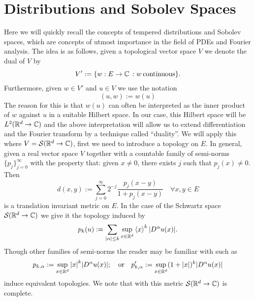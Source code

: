 \documentclass[
    a4paper,
    DIV=14,
    abstract=true,
    numbers=noenddot
]{scrartcl}
\begin{document}
\section{Distributions and Sobolev Spaces}\label{distrsec}
Here we will quickly recall the concepts of tempered distributions and Sobolev spaces, which are concepts of utmost importance in the field of PDEs and Fourier analysis.
The idea is as follows, given a topological vector space $V$ we denote the dual of $V$  by \[V':=\lbrace w:E\to\mathbb{C}\hspace{2pt}: w \hspace{2pt}\text{continuous}\rbrace.\]
Furthermore, given $w\in V'$ and $u\in V$ we use the notation
\begin{equation*}
	(u,w):=w(u)
\end{equation*}
The reason for this is that $w(u)$ can often be interpreted as the inner product of $w$ against $u$ in a suitable Hilbert space. In our case, this Hilbert space will be $L^2(\mathbb{R}^d\to\mathbb{C})$ and the above interpretation will allow us to extend differentiation and the Fourier transform by a technique called ``duality''.
\bigbreak  We will apply this where $V=\mathcal{S}(\mathbb{R}^d\to\mathbb{C})$, first we need to introduce a topology on $E$.
In general, given a real vector space $V$ together with a countable family of semi-norms $\lbrace p_j\rbrace_{j=0}^\infty$ with the property that: given $x\neq 0$, there exists $j$ such that $p_j(x)\neq 0$. Then
\begin{equation}\label{seminormsgivemetric}
	d(x,y):=\sum_{j=0}^\infty 2^{-j}\frac{p_j(x-y)}{1+p_j(x-y)}\quad \forall{x,y}\in {E}
\end{equation}
is a translation invariant metric on $E$. In the case of the Schwartz space $\mathcal{S}(\mathbb{R}^d\to\mathbb{C})$ we give it the topology induced by
\begin{equation}\label{seminornormsSchwartz}
	p_k(u):=\sum_{{\left| \alpha \right|}\leq k} \sup_{x\in\mathbb{R}^d}\left\langle x\right\rangle^k {\left| D^\alpha u(x) \right|}.
\end{equation}
Though other families of semi-norms the reader may be familiar with such as
\[p_{k,\alpha}:=\sup_{x\in\mathbb{R}^d}{\left| x \right|}^k {\left| D^\alpha u(x) \right|};\quad\text{or}\quad p'_{k,\alpha}:=\sup_{x\in\mathbb{R}^d}(1+{\left| x \right|})^k {\left| D^\alpha u(x) \right|}\]
induce equivalent topologies. We note that with this metric $\mathcal{S}(\mathbb{R}^d\to\mathbb{C})$ is complete.
\end{document}
